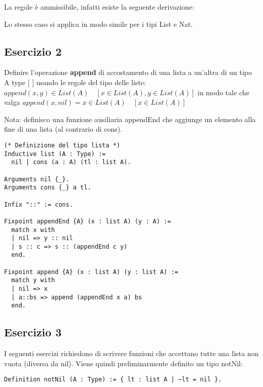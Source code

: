 \begin{prooftree}
\end{prooftree}

La regole è ammissibile, infatti esiste la seguente derivazione:

\begin{prooftree}
\end{prooftree}

Lo stesso caso si applica in modo simile per i tipi List e Nat.

\subsection{Esercizio 2}

Definire l'operazione \textbf{append} di accostamento di una lista a un'altra di un tipo A 
type [ ] usando le regole del tipo delle liste:
$append(x, y) \in List(A) \quad [x \in List(A), y \in List(A)]$
in modo tale che valga $append(x, nil) = x \in List(A) \quad [x \in List(A)]$

Nota: definisco una funzione ausiliaria appendEnd che aggiunge un elemento alla fine 
di una lista (al contrario di cons).

\begin{lstlisting}[language=Coq]
(* Definizione del tipo lista *)
Inductive list (A : Type) :=
  nil | cons (a : A) (tl : list A).

Arguments nil {_}.
Arguments cons {_} a tl.

Infix "::" := cons.

Fixpoint appendEnd {A} (x : list A) (y : A) :=
  match x with
  | nil => y :: nil
  | s :: c => s :: (appendEnd c y)
  end.

Fixpoint append {A} (x : list A) (y : list A) :=
  match y with
  | nil => x
  | a::bs => append (appendEnd x a) bs
  end.
\end{lstlisting}

\subsection{Esercizio 3}

I seguenti esercizi richiedono di scrivere funzioni che accettano tutte una 
lista non vuota (diversa da nil). Viene quindi preliminarmente definito un tipo 
notNil:

\begin{lstlisting}[language=Coq]
Definition notNil (A : Type) := { lt : list A | ~lt = nil }.
\end{lstlisting}

